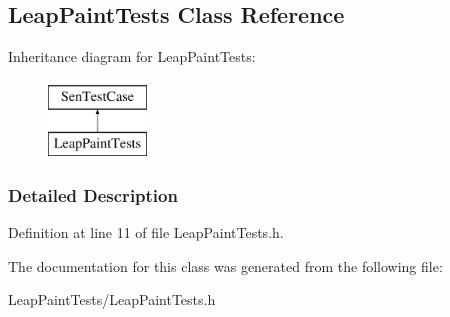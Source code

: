 \hypertarget{interface_leap_paint_tests}{\subsection{Leap\-Paint\-Tests Class Reference}
\label{d6/d93/interface_leap_paint_tests}
}
Inheritance diagram for Leap\-Paint\-Tests\-:\begin{figure}[H]
\begin{center}
\leavevmode
\includegraphics[height=2.000000cm]{d6/d93/interface_leap_paint_tests}
\end{center}
\end{figure}


\subsubsection{Detailed Description}


Definition at line 11 of file Leap\-Paint\-Tests.\-h.



The documentation for this class was generated from the following file\-:\begin{DoxyCompactItemize}
\item 
Leap\-Paint\-Tests/Leap\-Paint\-Tests.\-h\end{DoxyCompactItemize}
